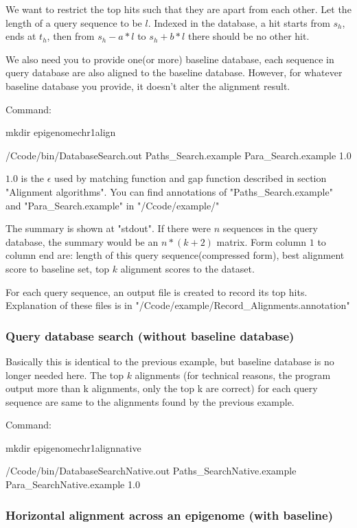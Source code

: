 \documentclass[a4paper]{article}
\begin{document}
\begin{CJK*}{UTF8}{kai}
We want to restrict the top hits such that they are apart from each other. Let the length of a query sequence to be $l$. Indexed in the database, a hit starts from $s_h$, ends at $t_h$, then from $s_h-a*l$ to $s_h+b*l$ there should be no other hit. 

We also need you to provide one(or more) baseline database, each sequence in query database are also aligned to the baseline database. However, for whatever baseline database you provide, it doesn't alter the alignment result.

Command:

mkdir epigenomechr1align

/Ccode/bin/DatabaseSearch.out Paths\_Search.example Para\_Search.example 1.0

$1.0$ is the $\epsilon$ used by matching function and gap function described in section "Alignment algorithms". You can find annotations of "Paths\_Search.example" and "Para\_Search.example" in "/Ccode/example/"

The summary is shown at "stdout". If there were $n$ sequences in the query database, the summary would be an $n*(k+2)$ matrix. Form column $1$ to column end are: length of this query sequence(compressed form), best alignment score to baseline set, top $k$ alignment scores to the dataset. 

For each query sequence, an output file is created to record its top hits. Explanation of these files is in "/Ccode/example/Record\_Alignments.annotation"

\subsubsection{Query database search (without baseline database)}

Basically this is identical to the previous example, but baseline database is no longer needed here. The top $k$ alignments (for technical reasons, the program output more than k alignments, only the top k are correct) for each query sequence are same to the alignments found by the previous example.

Command:

mkdir epigenomechr1alignnative

/Ccode/bin/DatabaseSearchNative.out Paths\_SearchNative.example Para\_SearchNative.example 1.0

\subsubsection{Horizontal alignment across an epigenome (with baseline)}


\end{CJK*}
\end{document}

